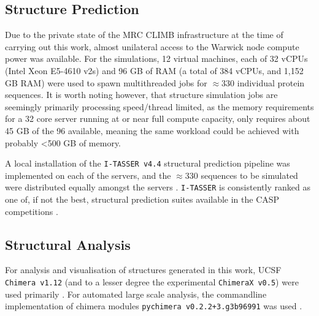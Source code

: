 
\subsection{Structure Prediction}\label{structuresimulation}
Due to the private state of the MRC CLIMB infrastructure at the time of carrying out this work, almost unilateral access to the Warwick node compute power was available. For the simulations, 12 virtual machines, each of 32 vCPUs (Intel Xeon E5-4610 v2s) and 96 GB of RAM (a total of 384 vCPUs, and 1,152 GB RAM) were used to spawn multithreaded jobs for $\approx$330 individual protein sequences. It is worth noting however, that structure simulation jobs are seemingly primarily processing speed/thread limited, as the memory requirements for a 32 core server running at or near full compute capacity, only requires about 45 GB of the 96 available, meaning the same workload could be achieved with probably \textless 500 GB of memory.

A local installation of the \texttt{I-TASSER v4.4} structural prediction pipeline was implemented on each of the servers, and the $\approx$330 sequences to be simulated were distributed equally amongst the servers \citep{Yang2014, Roy2010, Zhang2008}. \texttt{I-TASSER} is consistently ranked as one of, if not the best, structural prediction suites available in the CASP competitions \citep{Moult2015}. 


\subsection{Structural Analysis}
For analysis and visualisation of structures generated in this work, UCSF \texttt{Chimera v1.12} (and to a lesser degree the experimental \texttt{ChimeraX v0.5}) were used primarily \citep{Pettersen2004, Goddard2018}. For automated large scale analysis, the commandline implementation of chimera modules \texttt{pychimera v0.2.2+3.g3b96991} was used \citep{Rodriguez-GuerraPedregal2018}.

